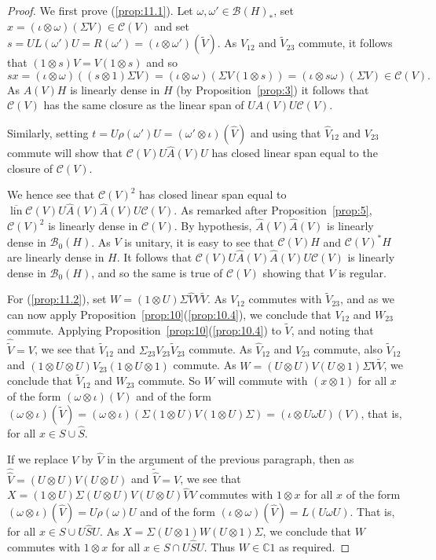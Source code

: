 \documentclass[a4paper,12pt]{article}
\theoremstyle{plain}
\theoremstyle{definition}
\newcommand{\mc}{\mathcal}
\newcommand{\lin}{{\operatorname{lin}}}
\begin{document}
\begin{proof}
We first prove (\ref{prop:11.1}).
Let $\omega,\omega'\in\mc B(H)_*$, set $x = (\iota\otimes\omega)(\Sigma V)
\in\mc C(V)$ and set $s=UL(\omega')U=R(\omega')
=(\iota\otimes\omega')(\tilde V)$.  As $V_{12}$ and $\tilde V_{23}$ commute,
it follows that $(1\otimes s)V = V(1\otimes s)$ and so
\[ sx = (\iota\otimes\omega)((s\otimes 1)\Sigma V)
= (\iota\otimes\omega)(\Sigma V(1\otimes s))
= (\iota\otimes s\omega)(\Sigma V) \in\mc C(V). \]
As $A(V)H$ is linearly dense in $H$ (by Proposition~\ref{prop:3}) it follows
that $\mc C(V)$ has the same closure as the linear span of $UA(V)U\mc C(V)$.

Similarly, setting $t=U\rho(\omega')U=(\omega'\otimes \iota)(\hat V)$ and
using that $\hat V_{12}$ and $V_{23}$ commute will show that
$\mc C(V) U\hat A(V)U$ has closed linear span equal to the closure of
$\mc C(V)$.

We hence see that $\mc C(V)^2$ has closed linear span equal to
$\overline{\lin} \mc C(V) U\hat A(V) \hat A(V) U \mc C(V)$.  As remarked
after Proposition~\ref{prop:5}, $\mc C(V)^2$ is linearly dense in $\mc C(V)$.
By hypothesis, $\hat A(V) \hat A(V)$ is linearly dense in $\mc B_0(H)$.
As $V$ is unitary, it is easy to see that $\mc C(V)H$ and $\mc C(V)^*H$ are
linearly dense in $H$.  It follows that $\mc C(V) U\hat A(V) \hat A(V) U
\mc C(V)$ is linearly dense in $\mc B_0(H)$, and so the same is true of
$\mc C(V)$ showing that $V$ is regular.

For (\ref{prop:11.2}), set $W=(1\otimes U)\Sigma\hat V V \tilde V$.  As
$V_{12}$ commutes with $\tilde V_{23}$, and as we can now apply
Proposition~\ref{prop:10}(\ref{prop:10.4}), we conclude that $V_{12}$ and
$W_{23}$ commute.  Applying Proposition~\ref{prop:10}(\ref{prop:10.4}) to
$\tilde V$, and noting that $\hat{\tilde V} = V$,
we see that $\tilde V_{12}$ and $\Sigma_{23} V_{23} \tilde V_{23}$
commute.  As $\hat V_{12}$ and $V_{23}$ commute, also
$\tilde V_{12}$ and $(1\otimes U\otimes U)V_{23}(1\otimes U\otimes 1)$
commute.  As $W=(U\otimes U)V(U\otimes 1)\Sigma V\tilde V$, we conclude
that $\tilde V_{12}$ and $W_{23}$ commute.  So $W$ will commute with
$(x\otimes 1)$ for all $x$ of the form $(\omega\otimes\iota)(V)$ and of the
form $(\omega\otimes\iota)(\tilde V) = (\omega\otimes\iota)(\Sigma(1\otimes U)
V (1\otimes U)\Sigma) = (\iota\otimes U\omega U)(V)$, that is, for all
$x\in S \cup \hat S$.

If we replace $V$ by $\hat V$ in the argument of the previous paragraph, then
as $\hat{\hat V} = (U\otimes U)V(U\otimes U)$ and $\tilde{\hat V}=V$,
we see that $X=(1\otimes U)\Sigma (U\otimes U)V(U\otimes U)\hat VV$
commutes with $1\otimes x$ for all $x$ of the form $(\omega\otimes\iota)(\hat V)
= U\rho(\omega)U$ and of the form $(\iota\otimes\omega)(\hat V)=
L(U\omega U)$.  That is, for all $x\in S\cup U\hat SU$.  As
$X = \Sigma(U\otimes 1)W(U\otimes 1)\Sigma$, we conclude that $W$
commutes with $1\otimes x$ for all $x\in S\cap U\hat SU$.
Thus $W\in\mathbb C1$ as required.
\end{proof}
\end{document}
